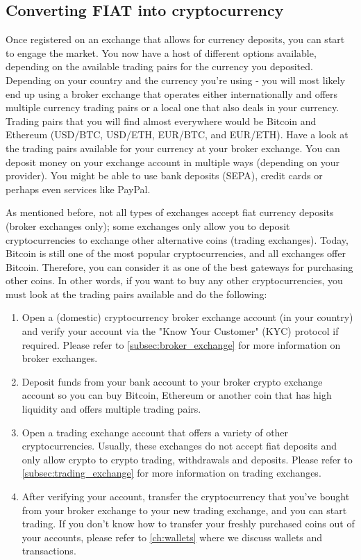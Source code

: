 \newpage

\subsection*{Converting FIAT into cryptocurrency}
 Once registered on an exchange that allows for currency deposits, you can start to engage the market. You now have a host of different options available, depending on the available trading pairs for the currency you deposited. Depending on your country and the currency you're using - you will most likely end up using a broker exchange that operates either internationally and offers multiple currency trading pairs or a local one that also deals in your currency. Trading pairs that you will find almost everywhere would be Bitcoin and Ethereum (USD/BTC, USD/ETH, EUR/BTC, and EUR/ETH). Have a look at the trading pairs available for your currency at your broker exchange. You can deposit money on your exchange account in multiple ways (depending on your provider). You might be able to use bank deposits (SEPA), credit cards or perhaps even services like PayPal.\medskip

As mentioned before, not all types of exchanges accept fiat currency deposits (broker exchanges only); some exchanges only allow you to deposit cryptocurrencies to exchange other alternative coins (trading exchanges). Today, Bitcoin is still one of the most popular cryptocurrencies, and all exchanges offer Bitcoin. Therefore, you can consider it as one of the best gateways for purchasing other coins. In other words, if you want to buy any other cryptocurrencies, you must look at the trading pairs available and do the following:

\begin{enumerate}
    \item Open a (domestic) cryptocurrency broker exchange account (in your country) and verify your account via the "Know Your Customer" (KYC) protocol if required. Please refer to \cref{subsec:broker_exchange} for more information on broker exchanges.
    \item Deposit funds from your bank account to your broker crypto exchange account so you can buy Bitcoin, Ethereum or another coin that has high liquidity and offers multiple trading pairs.
    \item Open a trading exchange account that offers a variety of other cryptocurrencies. Usually, these exchanges do not accept fiat deposits and only allow crypto to crypto trading, withdrawals and deposits. Please refer to \cref{subsec:trading_exchange} for more information on trading exchanges.
    \item After verifying your account, transfer the cryptocurrency that you've bought from your broker exchange to your new trading exchange, and you can start trading. If you don't know how to transfer your freshly purchased coins out of your accounts, please refer to \cref{ch:wallets} where we discuss wallets and transactions.
\end{enumerate}


